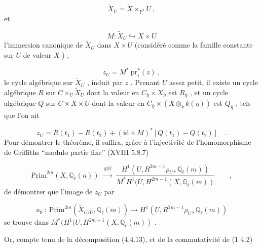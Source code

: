 \begin{equation*}
\widetilde{X}_U = \widetilde{X} \times_{\mathbb{P}^1} U \ ,
\end{equation*}
et

\begin{equation*}
M : \widetilde{X}_U \hookrightarrow X \times U
\end{equation*}
l'immersion canonique de $\widetilde{X}_U$ dans $X \times U$ (considéré comme la famille constante sur $U$ de valeur $X$ ) ,

\begin{equation*}
z_U = M^* \ \mathrm{pr}_i^*(z) \ ,
\end{equation*}
le cycle algébrique sur $\widetilde{X}_U$ , induit par $z$ . Prenant $U$ assez petit, il existe un cycle algébrique $R$ sur $C \times_U \widetilde{X}_U$ dont la valeur en $C_{\bar\eta} \times X_{\bar\eta}$ est $R_{\bar\eta}$ , et un cycle algébrique $Q$ sur $C \times X \times U$ dont la valeur en $C_{\bar\eta} \times (X \otimes_k k(\bar\eta))$ est $Q_{\bar\eta}$ , tels que l'on ait

\begin{equation}\tag{4.4.13}
z_U = R(t_1) - R(t_2) + (\mathrm{id}\times M)^*[Q(t_1) - Q(t_2)] \quad .
\end{equation}
Pour démontrer le théorème, il suffira, grâce à l'injectivité de
l'homomorphisme de Griffiths  ``modulo partie fixe'' (XVIII 5.8.7)

\begin{equation*}
\mathrm{Prim}^{2m}(X,\mathbb{Q}_\ell(n)) \ \xrightarrow{\ \underline{\mathrm{grif}}\ }\ \frac{H^1(U,R^{2m-1}\rho_{U*}\mathbb{Q}_\ell(m))}{M^*H^1(U,H^{2m-1}(X,\mathbb{Q}_\ell(m))} \qquad ,
\end{equation*}
de démontrer que l'image de  $z_U$  par

\begin{equation*}
u_0 \ : \ \mathrm{Prim}^{2m}(\widetilde{X}_{U/U},\mathbb{Q}_\ell(m)) \longrightarrow H^1(U,R^{2m-1}\rho_{U*}\mathbb{Q}_\ell(m))
\end{equation*}
se trouve dans  $M^*(H^1(U,H^{2m-1}(X,\mathbb{Q}_\ell(m))$  .

Or, compte tenu de la décomposition (4.4.13), et de la commutativité de (1 4.2)

